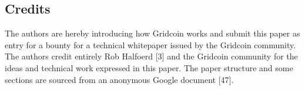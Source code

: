 \subsection{Credits}
\label{sec:credits}

The authors are hereby introducing how Gridcoin works and submit this paper as entry for a bounty for a technical whitepaper issued by the Gridcoin community. The authors credit entirely Rob Halfoerd [3] and the Gridcoin community for the ideas and technical work expressed in this paper. The paper structure and some sections are sourced from an anonymous Google document [47].
